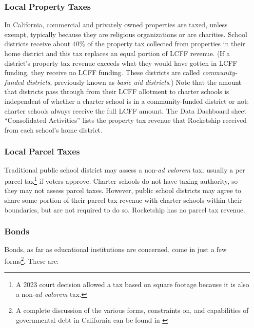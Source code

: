 \subsubsection{Local Property Taxes}%
\label{sec:property-taxes}\indent%

In California, commercial and privately owned properties are taxed, unless exempt, typically because they are religious organizations or are charities. School districts receive about 40\% of the property tax collected from properties in their home district and this tax replaces an equal portion of LCFF revenue. (If a district's property tax revenue exceeds what they would have gotten in LCFF funding, they receive no LCFF funding. These districts are called \textit{community-funded districts}, previously known as \textit{basic aid districts}.) Note that the amount that districts pass through from their LCFF allotment to charter schools is independent of whether a charter school is in a community-funded district or not; charter schools always receive the full LCFF amount. The Data Dashboard sheet ``Consolidated Activities'' lists the property tax revenue that Rocketship received from each school's home district.

\subsubsection{Local Parcel Taxes}%
\label{sec:parcel-taxes}\indent%

Traditional public school district may assess a non-\textit{ad valorem} tax, usually a per parcel tax\footnote{A 2023 court decision allowed a tax based on square footage because it is also a non-\textit{ad valorem} tax.} if voters approve. Charter schools do not have taxing authority, so they may not assess parcel taxes. However, public school districts may agree to share some portion of their parcel tax revenue with charter schools within their boundaries, but are not required to do so. Rocketship has no parcel tax revenue.

\subsubsection{Bonds}%
\label{sec:bonds}\indent%

Bonds, as far as educational institutions are concerned, come in just a few forms\footnote{A complete discussion of the various forms, constraints on, and capabilities of governmental debt in California can be found in  \parencite{CDIAC2023}}. These are:

